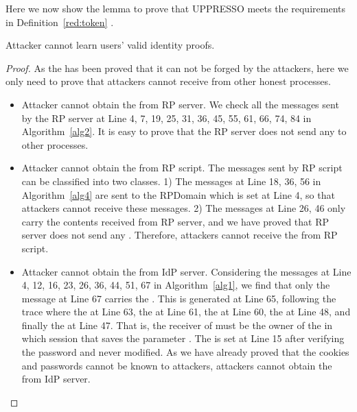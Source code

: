 Here we now show the lemma to prove that UPPRESSO meets the requirements in Definition~\ref{red:token} .
\begin{relemma}
Attacker cannot learn users' valid identity proofs.
\end{relemma}
\begin{proof}
As the  has been proved that it can not be forged by the attackers, here we only need to prove that attackers cannot receive  from other honest processes.
\begin{itemize}
\setlength\itemsep{-2pt}
\item Attacker cannot obtain the  from RP server.  We check all the messages sent by the RP server at Line 4, 7, 19, 25, 31, 36, 45, 55, 61, 66, 74, 84 in Algorithm~\ref{alg2}. It is easy to prove that the RP server does not send any  to other processes.
\item Attacker cannot obtain the  from RP script. The  messages sent by RP script can be classified into two classes. 1) The messages at Line 18, 36, 56 in Algorithm~\ref{alg4}  are sent to the RPDomain which is set at Line 4, so that attackers cannot receive these messages. 2) The messages at Line 26,  46 only carry the contents received from RP server, and we have proved that RP server does not send any . Therefore, attackers cannot receive the  from RP script.
\item Attacker cannot obtain the  from IdP server.  Considering the messages at Line 4, 12, 16, 23, 26, 36, 44, 51, 67 in Algorithm~\ref{alg1}, we find that only the message at Line 67 carries the . This  is generated at Line 65, following the trace where the  at Line 63, the  at Line 61, the  at Line 60, the  at Line 48, and finally the  at Line 47. That is, the receiver of   must be the owner of the  in which session that saves the parameter  . The  is set at Line 15 after verifying the password and never modified. As we have already proved that the cookies and passwords cannot be known to attackers,  attackers cannot obtain the  from IdP server.

\end{itemize}
\end{proof}
